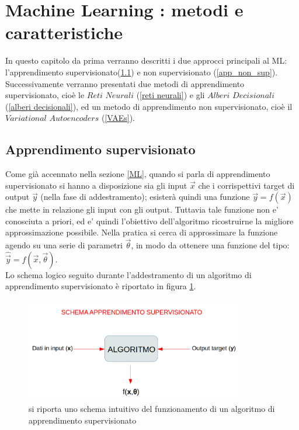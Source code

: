 \section{Machine Learning : metodi e caratteristiche}
\label{ML: metodi e caratteristiche}

In questo capitolo da prima verranno descritti i due approcci principali al ML: l'apprendimento supervisionato(\ref{app_sup}) e non supervisionato (\ref{app_non_sup}). Successivamente verranno presentati due metodi di apprendimento supervisionato, cioè le $\textit{Reti Neurali}$ (\ref{reti neurali}) e gli $\textit{Alberi Decisionali}$ (\ref{alberi decisionali}), ed un metodo di apprendimento non supervisionato, cioè il $\textit{Variational Autoencoders}$ (\ref{VAEs}).


\subsection{Apprendimento supervisionato}
\label{app_sup}
Come già accennato nella sezione \ref{ML}, quando si parla di apprendimento supervisionato si hanno a disposizione sia gli input $\vec{x}$ che i corrispettivi target di output $\vec{y}$ (nella fase di addestramento); esisterà quindi una funzione 
$\vec{y} = f(\vec{x})$ che mette in relazione gli input con gli output. Tuttavia tale funzione non e' conosciuta a priori, ed e' quindi l'obiettivo dell'algoritmo ricostruirne la migliore approssimazione possibile.
Nella pratica si cerca di approssimare la funzione agendo su una serie di parametri $\vec{\theta}$, in modo da ottenere una funzione del tipo: $\hat{\vec{y}} = f(\vec{x},\vec{\theta})$. \\
Lo schema logico seguito durante l'addestramento di un algoritmo di apprendimento supervisionato è riportato in figura \ref{fig:schema_app_sup}.

\begin{figure}[h!]
	\centering
	\includegraphics[width=0.85\textwidth]{figs/App_sup.png}
	\caption{si riporta uno schema intuitivo del funzionamento di un algoritmo di apprendimento supervisionato}
	\label{fig:schema_app_sup}
\end{figure}


